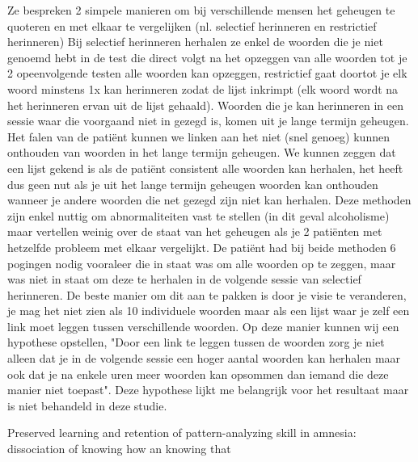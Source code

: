 \documentclass{hogent-article}
\begin{document}
	Ze bespreken 2 simpele manieren om bij verschillende mensen het geheugen te quoteren en met
	elkaar te vergelijken (nl. selectief herinneren en restrictief herinneren)
	Bij selectief herinneren herhalen ze enkel de woorden die je niet genoemd hebt in de test die direct volgt na het
	opzeggen van alle woorden tot je 2 opeenvolgende testen alle woorden kan opzeggen, restrictief gaat doortot je elk woord minstens
	1x kan herinneren zodat de lijst inkrimpt (elk woord wordt na het herinneren ervan uit de lijst gehaald).
	Woorden die je kan herinneren in een sessie waar die voorgaand niet in gezegd is, komen uit je lange
	termijn geheugen. Het falen van de patiënt kunnen we linken aan het niet (snel genoeg) kunnen onthouden van woorden in het
	lange termijn geheugen. We kunnen zeggen dat een lijst gekend is als de patiënt consistent alle woorden kan herhalen, het heeft dus geen nut als
	je uit het lange termijn geheugen woorden kan onthouden wanneer je andere woorden die net gezegd zijn niet kan herhalen.
	Deze methoden zijn enkel nuttig om abnormaliteiten vast te stellen (in dit geval alcoholisme) maar vertellen weinig over de staat van het geheugen
	als je 2 patiënten met hetzelfde probleem met elkaar vergelijkt. De patiënt had bij beide methoden 6 pogingen nodig vooraleer die in staat was om alle woorden
	op te zeggen, maar was niet in staat om deze te herhalen in de volgende sessie van selectief herinneren. De beste manier om dit aan te pakken is door je visie te 
	veranderen, je mag het niet zien als 10 individuele woorden maar als een lijst waar je zelf een link moet leggen tussen verschillende woorden. Op deze manier kunnen wij
	een hypothese opstellen, "Door een link te leggen tussen de woorden zorg je niet alleen dat je in de volgende sessie een hoger aantal woorden kan herhalen maar ook 
	dat je na enkele uren meer woorden kan opsommen dan iemand die deze manier niet toepast". Deze hypothese lijkt me belangrijk voor het resultaat maar is niet behandeld in deze studie.
	
	
	Preserved learning and retention of pattern-analyzing skill in amnesia: dissociation of knowing how an knowing that \autocite{CohenSquire1980}
	
\end{document}
